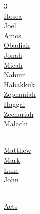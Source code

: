\begin{multicols}{3}
\\
\hspace{1em}\hyperlink{book-hosea}{Hosea}\\
\hspace{1em}\hyperlink{book-joel}{Joel}\\
\hspace{1em}\hyperlink{book-amos}{Amos}\\
\hspace{1em}\hyperlink{book-obadiah}{Obadiah}\\
\hspace{1em}\hyperlink{book-jonah}{Jonah}\\
\hspace{1em}\hyperlink{book-micah}{Micah}\\
\hspace{1em}\hyperlink{book-nahum}{Nahum}\\
\hspace{1em}\hyperlink{book-habakkuk}{Habakkuk}\\
\hspace{1em}\hyperlink{book-zephaniah}{Zephaniah}\\
\hspace{1em}\hyperlink{book-haggai}{Haggai}\\
\hspace{1em}\hyperlink{book-zechariah}{Zechariah}\\
\hspace{1em}\hyperlink{book-malachi}{Malachi}\\
\vspace{4pt}

\columnbreak

\\
\hspace{1em}\hyperlink{book-matthew}{Matthew}\\
\hspace{1em}\hyperlink{book-mark}{Mark}\\
\hspace{1em}\hyperlink{book-luke}{Luke}\\
\hspace{1em}\hyperlink{book-john}{John}\\
\vspace{4pt}

\\
\hspace{1em}\hyperlink{book-acts}{Acts}\\
\vspace{4pt}


\end{multicols}
